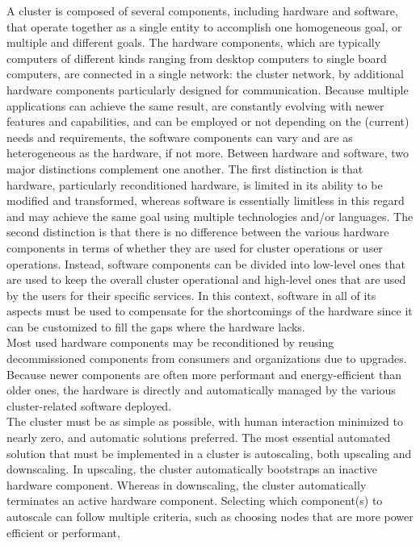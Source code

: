 A cluster is composed of several components, including hardware and software,
that operate together as a single entity to accomplish one homogeneous goal, or multiple
and different goals. The hardware components, which are typically computers of different
kinds ranging from desktop computers to single board computers, are connected in
a single network: the cluster network, by additional hardware components
particularly designed for communication. Because multiple applications can achieve
the same result, are constantly evolving with newer features and capabilities, and
can be employed or not depending on the (current) needs and requirements, the
software components can vary and are as heterogeneous as the hardware, if not more.
Between hardware and software, two major distinctions complement one another.
The first distinction is that hardware, particularly reconditioned hardware, is
limited in its ability to be modified and transformed, whereas software is essentially
limitless in this regard and may achieve the same goal using multiple technologies
and/or languages. The second distinction is that there is no difference between
the various hardware components in terms of whether they are used for cluster
operations or user operations. Instead, software components can be divided into
low-level ones that are used to keep the overall cluster operational and high-level
ones that are used by the users for their specific services. In this context,
software in all of its aspects must be used to compensate for the shortcomings
of the hardware since it can be customized to fill the gaps where the hardware
lacks. \\ %
Most used hardware components may be reconditioned by reusing decommissioned
components from consumers and organizations due to upgrades. Because newer components
are often more performant and energy-efficient than older ones, the hardware is
directly and automatically managed by the various cluster-related software
deployed. \\ %
The cluster must be as simple as possible, with human interaction minimized to nearly
zero, and automatic solutions preferred. The most essential automated solution that
must be implemented in a cluster is autoscaling, both upscaling and downscaling.
In upscaling, the cluster automatically bootstraps an inactive hardware
component. Whereas in downscaling, the cluster automatically terminates an
active hardware component. Selecting which component(s) to autoscale can follow
multiple criteria, such as choosing nodes that are more power efficient or performant,
